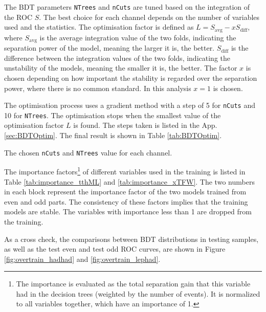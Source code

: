 The BDT parameters \texttt{NTrees} and \texttt{nCuts} are tuned based on the integration of the ROC $S$. The best choice for each channel depends on the number of variables used and the statistics. The optimisation factor is defined as $L=S_\mathrm{avg}-xS_\mathrm{diff}$, where $S_\mathrm{avg}$ is the average integration value of the two folds, indicating the separation power of the model, meaning the larger it is, the better. $S_\mathrm{diff}$ is the difference between the integration values of the two folds, indicating the unstability of the models, meaning the smaller it is, the better. The factor $x$ is chosen depending on how important the stability is regarded over the separation power, where there is no common standard. In this analysis $x=1$ is chosen.

The optimisation process uses a gradient method with a step of 5 for \texttt{nCuts} and 10 for \texttt{NTrees}. The optimisation stops when the smallest value of the optimisation factor $L$ is found. The steps taken is listed in the App. \ref{sec:BDTOptim}. The final result is shown in Table \ref{tab:BDTOptim}.

%

\begin{table}
\caption{The chosen \texttt{nCuts} and \texttt{NTrees} value for each channel.}
\label{tab:BDTOptim}


\end{table}

The importance factors\footnote{
The importance is evaluated as the total separation gain that this variable had in the decision trees (weighted by the number of events). It is normalized to all variables together, which have an importance of 1.
}
of different variables used in the training is listed in Table \ref{tab:importance_tthML} and \ref{tab:importance_xTFW}. The two numbers in each block represent the importance factor of the two models trained from even and odd parts. The consistency of these factors implies that the training models are stable. The variables with importance less than 1 are dropped from the training.



As a cross check, the comparisons between BDT distributions in testing samples, as well as the test even and test odd ROC curves, are shown in Figure \ref{fig:overtrain_hadhad} and \ref{fig:overtrain_lephad}.






